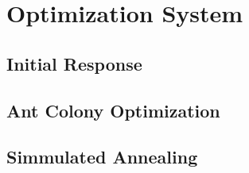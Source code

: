 \section{Optimization System}
\label{sec:os_implementation}




\subsection{Initial Response}
\label{sec:initial_response}


\subsection{Ant Colony Optimization}
\label{sec:aco_implementation}


\subsection{Simmulated Annealing}
\label{sec:sa_implementation}


